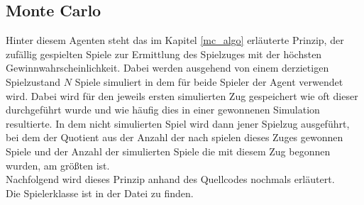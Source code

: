 \subsection{Monte Carlo}
Hinter diesem Agenten steht das im Kapitel \ref{mc_algo} erläuterte Prinzip, der zufällig gespielten Spiele zur Ermittlung des Spielzuges mit der höchsten Gewinnwahrscheinlichkeit. Dabei werden ausgehend von einem derzietigen Spielzustand $N$ Spiele simuliert in dem für beide Spieler der Agent  verwendet wird. Dabei wird für den jeweils ersten simulierten Zug gespeichert wie oft dieser durchgeführt wurde und wie häufig dies in einer gewonnenen Simulation resultierte. In dem nicht simulierten Spiel wird dann jener Spielzug ausgeführt, bei dem der Quotient aus der Anzahl der nach spielen dieses Zuges gewonnen Spiele und der Anzahl der simulierten Spiele die mit diesem Zug begonnen wurden, am größten ist.
\\Nachfolgend wird dieses Prinzip anhand des Quellcodes nochmals erläutert.
\\Die Spielerklasse  ist in der Datei  zu finden.
